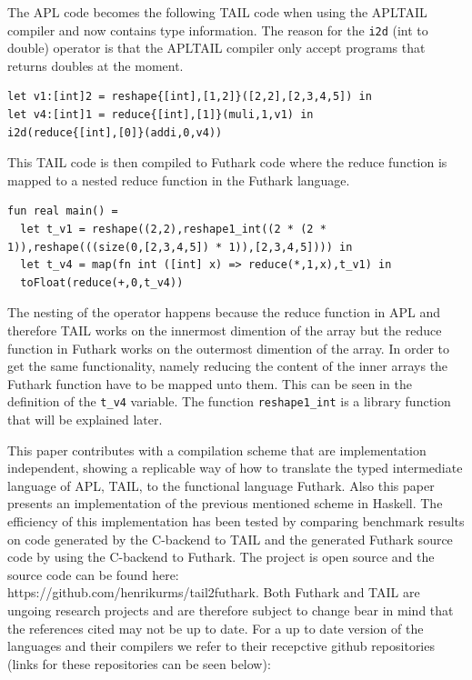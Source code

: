 \documentclass[11pt]{article}
\begin{document}
The APL code becomes the following TAIL code when using the APLTAIL compiler and now contains type information. The reason for the {\tt i2d} (int to double) operator is that the APLTAIL compiler only accept programs that returns doubles at the moment.

\begin{lstlisting}[numbers=none,frame=none]
let v1:[int]2 = reshape{[int],[1,2]}([2,2],[2,3,4,5]) in
let v4:[int]1 = reduce{[int],[1]}(muli,1,v1) in
i2d(reduce{[int],[0]}(addi,0,v4))
\end{lstlisting}

This TAIL code is then compiled to Futhark code where the reduce function is mapped to a nested reduce function in the Futhark language. 

\begin{lstlisting}[numbers=none,frame=none,breaklines=true]
fun real main() =
  let t_v1 = reshape((2,2),reshape1_int((2 * (2 * 1)),reshape(((size(0,[2,3,4,5]) * 1)),[2,3,4,5]))) in
  let t_v4 = map(fn int ([int] x) => reduce(*,1,x),t_v1) in
  toFloat(reduce(+,0,t_v4))
\end{lstlisting}

The nesting of the operator happens because the reduce function in APL and therefore TAIL works on the innermost dimention of the array but the reduce function in Futhark works on the outermost dimention of the array. In order to get the same functionality, namely reducing the content of the inner arrays the Futhark function have to be mapped unto them. This can be seen in the definition of the {\tt t\_v4} variable. 
The function {\tt reshape1\_int} is a library function that will be explained later. 

This paper contributes with a compilation scheme that are implementation independent, showing a replicable 
way of how to translate the typed intermediate language of APL, TAIL, to the functional language Futhark. Also 
this paper presents an implementation of the previous mentioned scheme in Haskell.
The efficiency of this implementation has been tested by comparing benchmark results on code generated by the C-backend to TAIL 
and the generated Futhark source code by using the C-backend to Futhark.
The project is open source and the source code can be found here:\\ https://github.com/henrikurms/tail2futhark.
Both Futhark and TAIL are ungoing research projects and are therefore subject to change bear in mind that the references cited may not be up to date. For a up to date version of the languages and their compilers we refer to their recepctive github repositories (links for these repositories can be seen below): \\
\end{document}
